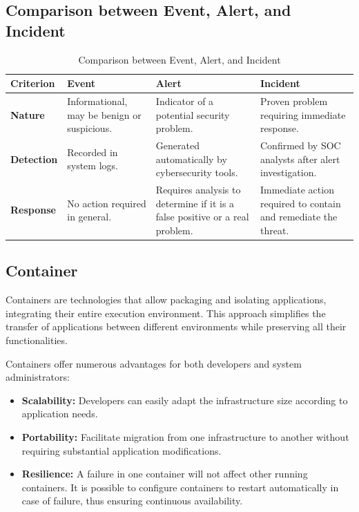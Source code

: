 \subsection{Comparison between Event, Alert, and Incident}

\begin{table}[H]
\centering
\caption{Comparison between Event, Alert, and Incident}
\label{tab:event-alert-incident}
\renewcommand{\arraystretch}{1.4}
\begin{tabular}{>{\raggedright\arraybackslash}p{2.5cm} p{3.5cm} p{3.5cm} p{3.5cm}}
\toprule
\rowcolor{tableheader}
\textbf{Criterion} & \textbf{Event} & \textbf{Alert} & \textbf{Incident} \\
\midrule
\textbf{Nature} & Informational, may be benign or suspicious. & Indicator of a potential security problem. & Proven problem requiring immediate response. \\
\midrule
\textbf{Detection} & Recorded in system logs. & Generated automatically by cybersecurity tools. & Confirmed by SOC analysts after alert investigation. \\
\midrule
\textbf{Response} & No action required in general. & Requires analysis to determine if it is a false positive or a real problem. & Immediate action required to contain and remediate the threat. \\
\bottomrule
\end{tabular}
\end{table}

\subsection{Container}
\label{subsec:container}

Containers are technologies that allow packaging and isolating applications, integrating their entire execution environment. This approach simplifies the transfer of applications between different environments while preserving all their functionalities.

Containers offer numerous advantages for both developers and system administrators:

\begin{itemize}
    \item \textbf{Scalability:} Developers can easily adapt the infrastructure size according to application needs.
    \item \textbf{Portability:} Facilitate migration from one infrastructure to another without requiring substantial application modifications.
    \item \textbf{Resilience:} A failure in one container will not affect other running containers. It is possible to configure containers to restart automatically in case of failure, thus ensuring continuous availability.
\end{itemize}

